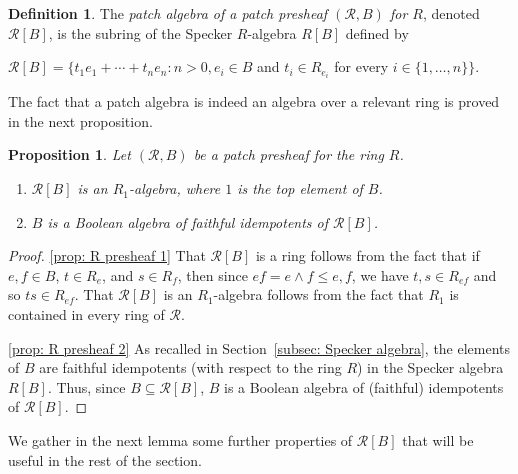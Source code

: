 \documentclass[11pt]{amsart}
\newtheorem{proposition}[theorem]{Proposition}
\theoremstyle{definition}
\newtheorem{definition}[theorem]{Definition}
\def\cal{\mathcal}
\begin{document}
\begin{definition}\label{dfn: R[presheaf]} The {\it patch algebra of a patch presheaf $({\cal R}, B)$ for $R$}, denoted
${\mathcal{R}}[B]$, is the subring of the Specker $R$-algebra $R[B]$ defined by  
\smallskip
\begin{center}
${\cal R}[B] = \{t_1e_1 + \cdots + t_n e_n : n>0, e_i \in B$ and $t_i \in R_{e_i}$ for every $i\in \{1,\ldots, n\}\}$.
\end{center}
\end{definition} 

The fact that a patch algebra is indeed an algebra over a relevant ring is proved in the next proposition. 

\begin{proposition} \label{prop: R presheaf}
Let $({\cal R},B)$ be a patch presheaf for the ring $R$. 

\begin{enumerate}[label=\textup{(\arabic{*})}, mode=unboxed]
\item\label{prop: R presheaf 1}
${\cal R}[B] $ is an $R_1$-algebra, where $1$ is the top element of $B$. 

\item\label{prop: R presheaf 2} $B$ is a Boolean algebra of faithful idempotents of ${\cal R}[B]$.
\end{enumerate}
\end{proposition}

\begin{proof} 
\ref{prop: R presheaf 1} That  ${\cal R}[B] $ is a ring follows from the fact that if $e,f\in B$, $t\in R_e$, and $s\in R_f$, then since $ef=e \wedge f \le e, f$, we have  $t,s\in R_{ef}$ and so $ts\in R_{ef}$. That ${\cal R}[B] $ is an $R_1$-algebra follows from the fact that $R_1$ is contained in every ring of ${\cal R}$.

\ref{prop: R presheaf 2} As recalled in Section~\ref{subsec: Specker algebra}, the elements of $B$ are faithful idempotents (with respect to the ring $R$) in the Specker algebra $R[B]$. Thus, since $B \subseteq {\cal R}[B]$, $B$ is a Boolean algebra of (faithful) idempotents of ${\cal R}[B]$. 
\end{proof}


We gather in the next lemma some further properties of ${\cal R}[B]$ that will be useful in the rest of the section.
\end{document}
